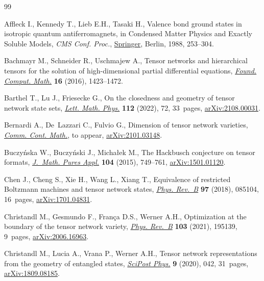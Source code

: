 \documentclass[10pt,a4paper]{amsart}
\numberwithin{equation}{section}
\begin{document}
\begin{thebibliography}{99}
\footnotesize\itemsep=0pt

Affleck I., Kennedy T., Lieb E.H., Tasaki H., Valence bond ground states in
  isotropic quantum antiferromagnets, in Condensed Matter Physics and Exactly
  Soluble Models, \textit{CMS Conf. Proc.}, \href{https://doi.org/10.1007/978-3-662-06390-3_19}{Springer}, Berlin, 1988, 253--304.

Bachmayr M., Schneider R., Uschmajew A., Tensor networks and hierarchical
  tensors for the solution of high-dimensional partial differential equations,
  \href{https://doi.org/10.1007/s10208-016-9317-9}{\textit{Found. Comput. Math.}} \textbf{16} (2016), 1423--1472.

Barthel T., Lu J., Friesecke G., On the closedness and geometry of tensor
  network state sets, \href{https://doi.org/10.1007/s11005-022-01552-z}{\textit{Lett. Math. Phys.}} \textbf{112} (2022), 72,
  33~pages, \href{https://arxiv.org/abs/2108.00031}{arXiv:2108.00031}.

Bernardi A., De~Lazzari C., Fulvio G., Dimension of tensor network varieties,
  \href{https://doi.org/10.1142/S0219199722500596}{\textit{Comm. Cont. Math.}}, {t}o appear, \href{https://arxiv.org/abs/2101.03148}{arXiv:2101.03148}.

Buczy\'nska W., Buczy\'nski J., Micha{\l}ek M., The {H}ackbusch conjecture on
  tensor formats, \href{https://doi.org/10.1016/j.matpur.2015.05.002}{\textit{J.~Math. Pures Appl.}} \textbf{104} (2015), 749--761,
  \href{https://arxiv.org/abs/1501.01120}{arXiv:1501.01120}.

Chen J., Cheng S., Xie H., Wang L., Xiang T., Equivalence of restricted
  Boltzmann machines and tensor network states, \href{https://doi.org/10.1103/PhysRevB.97.085104}{\textit{Phys. Rev.~B}}
  \textbf{97} (2018), 085104, 16~pages, \href{https://arxiv.org/abs/1701.04831}{arXiv:1701.04831}.

Christandl M., Gesmundo F., Fran{\c{c}}a D.S., Werner A.H., Optimization at the
  boundary of the tensor network variety, \href{https://doi.org/10.1103/PhysRevB.103.195139}{\textit{Phys. Rev.~B}} \textbf{103}
  (2021), 195139, 9~pages, \href{https://arxiv.org/abs/2006.16963}{arXiv:2006.16963}.

Christandl M., Lucia A., Vrana P., Werner A.H., Tensor network representations
  from the geometry of entangled states, \href{https://doi.org/10.21468/scipostphys.9.3.042}{\textit{SciPost Phys.}} \textbf{9}
  (2020), 042, 31~pages, \href{https://arxiv.org/abs/1809.08185}{arXiv:1809.08185}.


\end{thebibliography}
\end{document}

